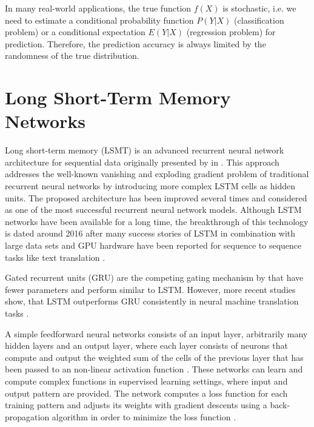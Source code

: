 In many real-world applications, the true function $f(X)$ is stochastic, i.e. we need to estimate a conditional probability function $P(Y | X)$ (classification problem) or a conditional expectation $E(Y | X)$ (regression problem) for prediction.
Therefore, the prediction accuracy is always limited by the randomness of the true distribution.

\section{Long Short-Term Memory Networks}

Long short-term memory (LSMT) is an advanced recurrent neural network architecture for sequential data originally presented by \citeauthor{DBLP:journals/neco/HochreiterS97} in \citeyear{DBLP:journals/neco/HochreiterS97}  \cite{DBLP:journals/neco/HochreiterS97}.
This approach addresses the well-known vanishing and exploding gradient problem \cite{DBLP:conf/icml/PascanuMB13}  of traditional recurrent neural networks by introducing more complex LSTM cells as hidden units.
The proposed architecture has been improved several times \cite{DBLP:journals/neco/GersSC00} \cite {DBLP:journals/tnn/GreffSKSS17} and considered as one of the most successful recurrent neural network models.
Although LSTM networks have been available for a long time, the breakthrough of this technology is dated around 2016 after many success stories of LSTM in combination with large data sets and GPU hardware have been reported for sequence to sequence tasks like text translation \cite{DBLP:journals/corr/WuSCLNMKCGMKSJL16}.

Gated recurrent units (GRU) \cite{DBLP:conf/emnlp/ChoMGBBSB14} are the competing gating mechanism by \citeauthor{DBLP:conf/emnlp/ChoMGBBSB14} that have fewer parameters and perform similar to LSTM.
However, more recent studies show, that LSTM outperforms GRU consistently in neural machine translation tasks \cite{DBLP:journals/corr/BritzGLL17}.

A simple feedforward neural networks consists of an input layer, arbitrarily many hidden layers and an output layer, where each layer consists of neurons that compute and output the weighted sum of the cells of the previous layer that has been passed to an non-linear activation function \cite{DBLP:journals/nn/Schmidhuber15}.
These networks can learn and compute complex functions in supervised learning settings, where input and output pattern are provided.
The network computes a loss function for each training pattern and adjusts its weights with gradient descents using a back-propagation algorithm in order to minimize the loss function \cite{rumelhart1986learning}.

